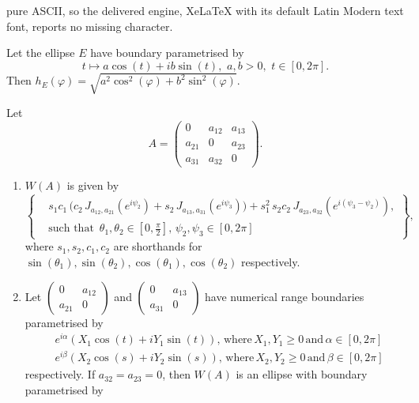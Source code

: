 \documentclass[10pt,a4paper]{amsart}
\renewcommand{\phi}{\varphi}
\begin{document}
pure ASCII, so the delivered engine, XeLaTeX with its default Latin Modern text font, reports no missing character.
\begin{Lemma}\label{ellipsesupport}
    Let the ellipse $E$ have boundary parametrised by 
    $$
    t \mapsto a \cos (t) + i b \sin (t) , \, \, a,b >0, \, \, t \in [0,2 \pi].
    $$ Then $ h_E(\phi) = \sqrt{a^2\cos^2(\phi) + b^2\sin^2(\phi)}$.
\end{Lemma}

\begin{Theorem}\label{3by3J}
    Let \begin{equation}\label{Athmain}
        A =  \begin{pmatrix}
        0 & a_{12} & a_{13} \\
        a_{21} & 0 & a_{23} \\
        a_{31} & a_{32} & 0
    \end{pmatrix}.
    \end{equation}
\begin{enumerate}
    \item $W(A)$ is given by
\begin{equation}\label{finalJ3by3}
\left\{
  \begin{aligned}
  & s_1c_1 \,\Big(
c_2 \, J_{a_{12},a_{21}}(e^{i\psi_2}) + s_2 \, J_{a_{13},a_{31}}(e^{i\psi_3})
\Big) + s_1^2 \, s_2c_2 \, J_{a_{23},a_{32}}(e^{i(\psi_3-\psi_2)}) ,\\
  &  \text{such that }\,  \theta_1, \theta_2 \in \left[0, \frac{\pi}{2}\right], \, \psi_2, \psi_3 \in \left[0, 2 \pi\right]
  \end{aligned}
\right\},
\end{equation}
where $s_1, s_2, c_1, c_2$ are shorthands for $\sin ( \theta_1), \sin ( \theta_2), \cos( \theta_1), \cos( \theta_2)$ respectively.



\item Let $\begin{pmatrix}
    0 & a_{12} \\
    a_{21} & 0 
\end{pmatrix}$ and $\begin{pmatrix}
    0 & a_{13} \\
    a_{31} & 0 
\end{pmatrix}$ have numerical range boundaries parametrised by 
$$
\begin{aligned}
    &e^{i \alpha}(X_1\cos(t) + iY_1 \sin(t)), \,  \text{where}  \, X_1,Y_1 \geq 0 \, \text{and} \, \alpha \in [0, 2 \pi] \\
    &e^{i \beta}(X_2 \cos(s) + i Y_2 \sin(s)), \,  \text{where}  \, X_2,Y_2 \geq 0 \, \text{and} \, \beta \in [0, 2 \pi]
\end{aligned}
$$
respectively. If $a_{32} = a_{23}=0$, then $W(A)$ is an ellipse with boundary parametrised by


\end{enumerate}
\end{Theorem}
\end{document}
